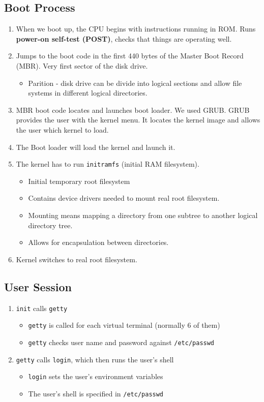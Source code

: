 \documentclass[]{article}
\begin{document}
\subsection{Boot Process}
\begin{enumerate}
\item When we boot up, the CPU begins with instructions running in ROM. Runs \textbf{power-on self-test (POST)}, checks that things are operating well.
\item Jumps to the boot code in the first 440 bytes of the Master Boot Record (MBR). Very first sector of the disk drive.
\begin{itemize}
\item Parition - disk drive can be divide into logical sections and allow file systems in different logical directories.
\end{itemize}
\item MBR boot code locates and launches boot loader. We used GRUB. GRUB provides the user with the kernel menu. It locates the kernel image and allows the user which kernel to load.
\item The Boot loader will load the kernel and launch it.
\item The kernel has to run \texttt{initramfs} (initial RAM filesystem).
\begin{itemize}
\item Initial temporary root filesystem
\item Contains device drivers needed to mount real root filesystem.
\item Mounting means mapping a directory from one subtree to another logical directory tree.
\item Allows for encapsulation between directories.
\end{itemize} 
\item Kernel switches to real root filesystem.
\end{enumerate}

\subsection{User Session}
\begin{enumerate}
\item \texttt{init} calls \texttt{getty}
\begin{itemize}
\item \texttt{getty} is called for each virtual terminal (normally 6 of them)
\item \texttt{getty} checks user name and password against \texttt{/etc/passwd}
\end{itemize}
\item \texttt{getty} calls \texttt{login}, which then runs the user's shell 
\begin{itemize}
\item \texttt{login} sets the user's environment variables
\item The user's shell is specified in \texttt{/etc/passwd}
\end{itemize}
\end{enumerate}
\end{document}
